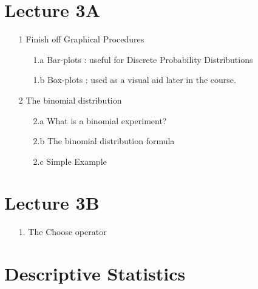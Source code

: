 \documentclass[]{report}
\begin{document}
		
		
		
		
		
		
\section{Lecture 3A}

\begin{itemize}
\item[1] Finish off Graphical Procedures
 \begin{itemize}
 \item[1.a] Bar-plots : useful for Discrete Probability Distributions
 \item[1.b] Box-plots : used as a visual aid later in the course.
 \end{itemize}
\item[2] The binomial distribution
\begin{itemize}
\item[2.a] What is a binomial experiment?
\item[2.b] The binomial distribution formula
\item[2.c] Simple Example
\end{itemize}  
\end{itemize}

\section{Lecture 3B}
\begin{itemize}
\item[1.] The Choose operator
\end{itemize}
\newpage






\section{Descriptive Statistics}
\end{document}
